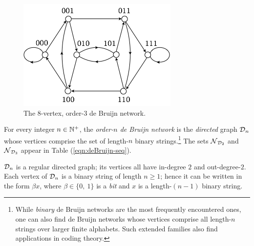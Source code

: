\begin{figure}[hbt]
\begin{center}
       \includegraphics[scale=0.46]{FiguresGraph/dB2by3}
       \caption{The $8$-vertex, order-$3$ de Bruijn network.}
  \label{fig:dB2by3}
\end{center}
\end{figure}

For every integer $n \in \mathbb{N}^+$, the {\it order-$n$ de Bruijn network} is the {\em directed} graph $\mbox{$\cal D$}_n$ whose vertices comprise the set of length-$n$ binary strings.\footnote{While {\em binary} de Bruijn networks are the most frequently encountered ones, one can also find de Bruijn networks whose vertices comprise all length-$n$ strings over larger finite alphabets.  Such extended families also find applications in coding theory.}  The sets $\mbox{$\cal N$}_{\mbox{{\scriptsize $\cal D$}}_2}$ and $\mbox{$\cal N$}_{\mbox{{\scriptsize $\cal D$}}_3}$ appear in Table (\ref{eqn:deBruijn-seq}).

\smallskip

$\mbox{$\cal D$}_n$ is a regular directed graph; its vertices all have in-degree $2$ and out-degree-$2$.  Each vertex of $\mbox{$\cal D$}_n$ is a binary string of length $n \geq 1$; hence it can be written in the form $\beta x$, where $\beta \in \{0, \ 1\}$ is a {\it bit} and $x$ is a length-$(n-1)$ binary string.

\smallskip

